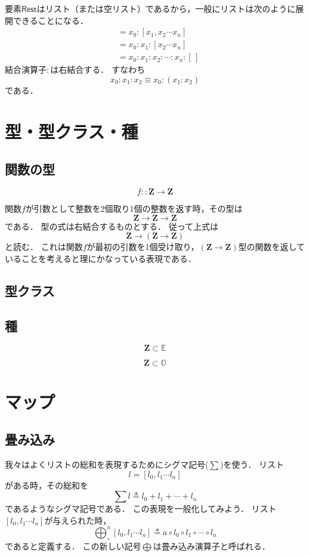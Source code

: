 \documentclass[twocolumn]{jsbook}
\newcommand{\foldfunc}{\bigoplus}
\newcommand{\typename}[1]{\bm{#1}}
\newcommand{\integertype}{\typename{Z}}
\newcommand{\listtype}[1]{\left[#1\right]}
\newcommand{\kindname}[1]{\mathbb{#1}}
\newcommand{\eqkind}{\kindname{E}}
\newcommand{\ordkind}{\kindname{O}}
\newcommand{\specialkeyword}[1]{\textsf{#1}}
\newcommand{\restelems}{\specialkeyword{Rest}}
\begin{document}
要素$\restelems$はリスト（または空リスト）であるから，一般にリストは次のように展開できることになる．
\begin{align*}
[x_0,x_1,x_2\dotsb x_n]&=x_0:[x_1,x_2\dotsb x_n]\\
&=x_0:x_1:[x_2\dotsb x_n]\\
&=x_0:x_1:x_2:\dotsb:x_n:[\,]
\end{align*}
結合演算子$:$は右結合する．
すなわち$$x_0:x_1:x_2\equiv x_0:(x_1:x_2)$$である．

\chapter{型・型クラス・種}

\section{関数の型}

$$f::\integertype\rightarrow\integertype$$

関数$f$が引数として整数を2個取り1個の整数を返す時，その型は$$\integertype\rightarrow\integertype\rightarrow\integertype$$である．
型の式は右結合するものとする．
従って上式は$$\integertype\rightarrow\left(\integertype\rightarrow\integertype\right)$$と読む．
これは関数$f$が最初の引数を1個受け取り，$(\integertype\rightarrow\integertype)$型の関数を返していることを考えると理にかなっている表現である．

\section{型クラス}

\section{種}

$$\integertype\subset\eqkind$$

$$\integertype\subset\ordkind$$

\chapter{マップ}

\section{畳み込み}

我々はよくリストの総和を表現するためにシグマ記号($\sum$)を使う．
リスト$$l=\listtype{l_0,l_1\dotsb l_n}$$がある時，その総和を$$\sum l\triangleq l_0+l_1+\dotsb+l_n$$であるようなシグマ記号である．
この表現を一般化してみよう．
リスト$\listtype{l_0,l_1\dotsb l_n}$が与えられた時，$$\foldfunc_\circ^a\listtype{l_0,l_1\dotsb l_n}\triangleq a\circ l_0\circ l_1\circ\dotsb\circ l_n$$であると定義する．
この新しい記号$\foldfunc$は畳み込み演算子と呼ばれる．
\end{document}
